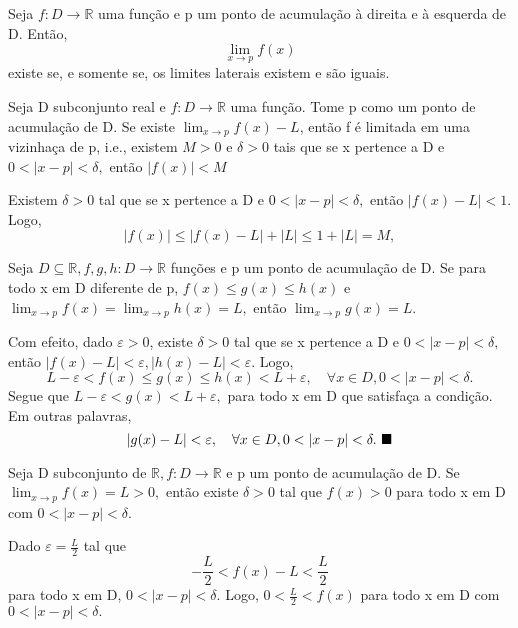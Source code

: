 \documentclass[analysis_notes.tex]{subfiles}
\begin{document}
\begin{crl*}
	Seja $f:D\rightarrow \mathbb{R}$ uma fun\c c\~ao e p um ponto de acumula\c c\~ao \`a direita e \`a esquerda de D. Ent\~ao,
	$$
		\lim_{x\to p}f(x)
	$$
	existe se, e somente se, os limites laterais existem e s\~ao iguais.
\end{crl*}
\begin{theorem*}
	Seja D subconjunto real e $f:D\rightarrow \mathbb{R}$ uma fun\c c\~ao. Tome p como um ponto de acumula\c c\~ao de D. Se
	existe $\lim_{x\to p}f(x) - L$, ent\~ao f \'e limitada em uma vizinha\c ca de p, i.e., existem $M>0$ e $\delta > 0$ tais que
	se x pertence a D e $0 <|x-p| < \delta,$ ent\~ao $|f(x)|< M$
\end{theorem*}
\begin{proof*}
	Existem $\delta > 0$ tal que se x pertence a D e $0<|x-p|<\delta,$ ent\~ao $|f(x)-L|<1.$ Logo,
	$$
		|f(x)| \leq{|f(x)-L| + |L|} \leq{1 + |L| = M},
	$$
\end{proof*}
\begin{theorem*}
	Seja $D\subseteq{\mathbb{R}}, f, g, h:D\rightarrow \mathbb{R}$ fun\c c\~oes e p um ponto de acumula\c c\~ao de D. Se
	para todo x em D diferente de p, $f(x)\leq{g(x)}\leq{h(x)}$ e $\lim_{x\to p}f(x) = \lim_{x\to p }h(x) = L,$ ent\~ao $\lim_{x\to p}g(x) = L.$
\end{theorem*}
\begin{proof*}
	Com efeito, dado $\varepsilon > 0$, existe $\delta > 0$ tal que se x pertence a D e $0 < |x-p| < \delta,$ ent\~ao
	$|f(x)-L|<\varepsilon, |h(x)-L|<\varepsilon.$ Logo,
	$$
		L - \varepsilon < f(x) \leq{g(x)} \leq{h(x)} < L +\varepsilon, \quad \forall x\in D, 0<|x-p|<\delta.
	$$
	Segue que $L-\varepsilon < g(x) < L+\varepsilon,$ para todo x em D que satisfa\c ca a condi\c c\~ao. Em outras palavras,
	$$
		|g(x)-L| < \varepsilon, \quad \forall x\in D, 0<|x-p|<\delta.\text{ \qedsymbol}
	$$
\end{proof*}
\begin{theorem*}
	Seja D subconjunto de $\mathbb{R}, f:D\rightarrow \mathbb{R}$ e p um ponto de acumula\c c\~ao de D. Se $\lim_{x\to p}f(x) = L > 0,$
	ent\~ao existe $\delta > 0$ tal que $f(x) > 0$ para todo x em D com $0<|x-p|<\delta.$
\end{theorem*}
\begin{proof*}
	Dado $\varepsilon = \frac{L}{2}$ tal que
	$$
		-\frac{L}{2} < f(x) - L < \frac{L}{2}
	$$
	para todo x em D, $0 < |x-p|<\delta.$ Logo, $0 <\frac{L}{2}<f(x)$ para todo x em D com $0 <|x-p|<\delta.$ \qedsymbol
\end{proof*}
\end{document}
